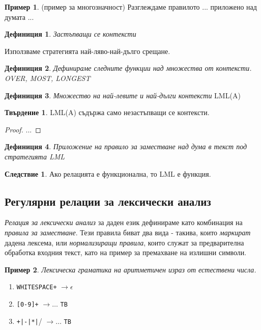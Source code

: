 \documentclass[12pt, oneside]{article}
\theoremstyle{definition}
\newtheorem{definition}{Дефиниция}[section]
\newtheorem{example}{Пример}[section]
\newtheorem{proposition}{Твърдение}[section]
\newtheorem{corollary}{Следствие}[section]
\begin{document}
\begin{example}
	(пример за многозначност) Разглеждаме правилото ... приложено над думата ...
\end{example}

\begin{definition}
	\emph{Застъпващи се контексти}
\end{definition}

Използваме стратегията най-ляво-най-дълго срещане.

\begin{definition}
	\emph{Дефинираме следните функции над множества от контексти. OVER, MOST, LONGEST}
\end{definition}

\begin{definition}
	\emph{Множество на най-левите и най-дълги контексти} LML(A)
\end{definition}

\begin{proposition}
	LML(A) съдържа само незастъпващи се контексти.
	\begin{proof}
		...
	\end{proof}
\end{proposition}

\begin{definition}
	\emph{Приложение на правило за заместване над дума в текст под стратегията LML}
\end{definition}

\begin{corollary}
	Ако релацията е функционална, то LML е функция.
\end{corollary}

\subsection{Регулярни релации за лексически анализ}

\emph{Релация за лексически анализ} за даден език дефинираме като комбинация на \emph{правила за заместване}. Тези правила биват два вида - такива, които \emph{маркират} дадена лексема, или \emph{нормализиращи правила}, които служат за предварителна обработка входния текст, като на пример за премахване на излишни символи.

\begin{example}{\emph{Лексическа граматика на аритметичен израз от естествени числа.}}
	\begin{enumerate}
		\item \verb/WHITESPACE+/ \( \to \epsilon \)
		\item \verb/[0-9]+/ \( \to \dots \) \verb/TB/
		\item \verb/+|-|*|// \( \to \dots \) \verb/TB/
	\end{enumerate}
\end{example}
\end{document}
